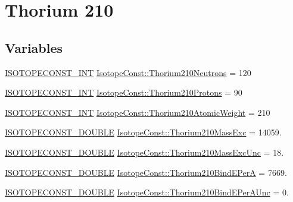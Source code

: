 \hypertarget{group___isotope_const-_thorium-_th210}{}\section{Thorium 210}
\label{group___isotope_const-_thorium-_th210}
\subsection*{Variables}
\begin{DoxyCompactItemize}
\item 
\mbox{\hyperlink{group___isotope_const-_macros_ga5f18360b3e99483a35c32d789e62621c}{I\+S\+O\+T\+O\+P\+E\+C\+O\+N\+S\+T\+\_\+\+I\+NT}} \mbox{\hyperlink{group___isotope_const-_thorium-_th210_gae43ef2778b70a9520348b3f696f70a6d}{Isotope\+Const\+::\+Thorium210\+Neutrons}} = 120
\item 
\mbox{\hyperlink{group___isotope_const-_macros_ga5f18360b3e99483a35c32d789e62621c}{I\+S\+O\+T\+O\+P\+E\+C\+O\+N\+S\+T\+\_\+\+I\+NT}} \mbox{\hyperlink{group___isotope_const-_thorium-_th210_ga1d0c13da818af042f1921761e0fce235}{Isotope\+Const\+::\+Thorium210\+Protons}} = 90
\item 
\mbox{\hyperlink{group___isotope_const-_macros_ga5f18360b3e99483a35c32d789e62621c}{I\+S\+O\+T\+O\+P\+E\+C\+O\+N\+S\+T\+\_\+\+I\+NT}} \mbox{\hyperlink{group___isotope_const-_thorium-_th210_gaf7e0c0e246ba534c78aa5792c250424a}{Isotope\+Const\+::\+Thorium210\+Atomic\+Weight}} = 210
\item 
\mbox{\hyperlink{group___isotope_const-_macros_ga8f45a7272ce02c0b4c65c44636ed719a}{I\+S\+O\+T\+O\+P\+E\+C\+O\+N\+S\+T\+\_\+\+D\+O\+U\+B\+LE}} \mbox{\hyperlink{group___isotope_const-_thorium-_th210_ga6da0a66ad83f928f3c594881b87661e6}{Isotope\+Const\+::\+Thorium210\+Mass\+Exc}} = 14059.
\item 
\mbox{\hyperlink{group___isotope_const-_macros_ga8f45a7272ce02c0b4c65c44636ed719a}{I\+S\+O\+T\+O\+P\+E\+C\+O\+N\+S\+T\+\_\+\+D\+O\+U\+B\+LE}} \mbox{\hyperlink{group___isotope_const-_thorium-_th210_ga469afeeb87b3da3afee096322dd6137b}{Isotope\+Const\+::\+Thorium210\+Mass\+Exc\+Unc}} = 18.
\item 
\mbox{\hyperlink{group___isotope_const-_macros_ga8f45a7272ce02c0b4c65c44636ed719a}{I\+S\+O\+T\+O\+P\+E\+C\+O\+N\+S\+T\+\_\+\+D\+O\+U\+B\+LE}} \mbox{\hyperlink{group___isotope_const-_thorium-_th210_ga70619ca1ee505d236ff29e4b45ec0b06}{Isotope\+Const\+::\+Thorium210\+Bind\+E\+PerA}} = 7669.
\item 
\mbox{\hyperlink{group___isotope_const-_macros_ga8f45a7272ce02c0b4c65c44636ed719a}{I\+S\+O\+T\+O\+P\+E\+C\+O\+N\+S\+T\+\_\+\+D\+O\+U\+B\+LE}} \mbox{\hyperlink{group___isotope_const-_thorium-_th210_ga21667302180b79dae1119976cea5fdf5}{Isotope\+Const\+::\+Thorium210\+Bind\+E\+Per\+A\+Unc}} = 0.

\end{DoxyCompactItemize}
